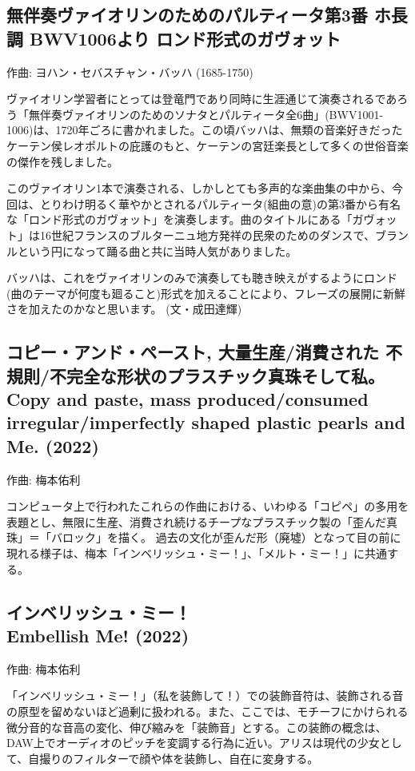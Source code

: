 \documentclass[a6paper, 9pt, openright, titlepage, twoside]{ltjsarticle}
\begin{document}
 
\subsection*{
無伴奏ヴァイオリンのためのパルティータ第3番 ホ長調 BWV1006より ロンド形式のガヴォット
}\label{bwv1006}
{\small 作曲: ヨハン・セバスチャン・バッハ (1685-1750)}

ヴァイオリン学習者にとっては登竜門であり同時に生涯通じて演奏されるであろう「無伴奏ヴァイオリンのためのソナタとパルティータ全6曲」(BWV1001-1006)は、1720年ごろに書かれました。この頃バッハは、無類の音楽好きだったケーテン侯レオポルトの庇護のもと、ケーテンの宮廷楽長として多くの世俗音楽の傑作を残しました。

このヴァイオリン1本で演奏される、しかしとても多声的な楽曲集の中から、今回は、とりわけ明るく華やかとされるパルティータ(組曲の意)の第3番から有名な「ロンド形式のガヴォット」を演奏します。曲のタイトルにある「ガヴォット」は16世紀フランスのブルターニュ地方発祥の民衆のためのダンスで、ブランルという円になって踊る曲と共に当時人気がありました。

バッハは、これをヴァイオリンのみで演奏しても聴き映えがするようにロンド(曲のテーマが何度も廻ること)形式を加えることにより、フレーズの展開に新鮮さを加えたのかなと思います。 (文・成田達輝)


\subsection*{
コピー・アンド・ペースト, 大量生産/消費された 不規則/不完全な形状のプラスチック真珠そして私。 \\
Copy and paste, mass produced/consumed irregular/imperfectly shaped plastic pearls and Me. (2022) 
}\label{copy}
{\small 作曲: 梅本佑利}

コンピュータ上で行われたこれらの作曲における、いわゆる「コピペ」の多用を表題とし、無限に生産、消費され続けるチープなプラスチック製の「歪んだ真珠」＝「バロック」を描く。
過去の文化が歪んだ形（廃墟）となって目の前に現れる様子は、梅本「インベリッシュ・ミー！」、「メルト・ミー！」に共通する。



\subsection*{
インベリッシュ・ミー！  \\
Embellish Me! (2022) }\label{embellish}
{\small 作曲: 梅本佑利}

「インベリッシュ・ミー！」（私を装飾して！）での装飾音符は、装飾される音の原型を留めないほど過剰に扱われる。また、ここでは、モチーフにかけられる微分音的な音高の変化、伸び縮みを「装飾音」とする。この装飾の概念は、DAW上でオーディオのピッチを変調する行為に近い。アリスは現代の少女として、自撮りのフィルターで顔や体を装飾し、自在に変身する。 
\end{document}
